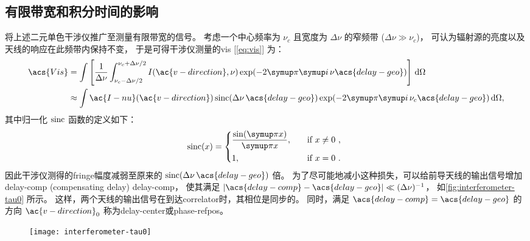 \subsection{有限带宽和积分时间的影响}

将上述二元单色干涉仪推广至测量有限带宽的信号。
考虑一个中心频率为 $\nu_c$ 且宽度为 $\Delta\nu$ 的窄频带 ($\Delta\nu \gg \nu_c$)，
可认为辐射源的亮度以及天线的响应在此频带内保持不变，
于是可得干涉仪测量的\ac{vis} [\autoref{eq:vis}] 为：
\begin{align}
  \acs{Vis}
    & = \int \left[ \frac{1}{\Delta\nu}
        \int_{\nu_c-\Delta\nu/2}^{\nu_c+\Delta\nu/2}
        I(\ac{v-direction}, \nu) \exp (-2\Cpi\Ci\, \nu\acs{delay-geo})
      \right] \,\D{\Omega} \\
    & \approx \int \ac{I-nu}(\ac{v-direction})
      \sinc (\Delta\nu\,\acs{delay-geo})
      \exp (-2\Cpi\Ci\, \nu_c\acs{delay-geo}) \,\D{\Omega},
  \label{eq:vis-bw}
\end{align}
其中归一化 $\operatorname{sinc}$ 函数的定义如下：
\begin{equation}
  \label{eq:sinc}
  \sinc(x) =
    \begin{dcases*}
      \frac{\sin(\Cpi x)}{\Cpi x}, \quad & if $x \neq 0$ , \\
      1, \quad & if $x = 0$ .
    \end{dcases*}
\end{equation}
因此干涉仪测得的\ac{fringe}幅度减弱至原来的
$\sinc(\Delta\nu\,\acs{delay-geo})$ 倍。
为了尽可能地减小这种损失，可以给前导天线的输出信号增加\acl{delay-comp}
(compensating delay) \ac{delay-comp}，
使其满足 $|\acs{delay-comp} - \acs{delay-geo}| \ll (\Delta\nu)^{-1}$，
如\autoref{fig:interferometer-tau0} 所示。
这样，两个天线的输出信号在到达\ac{correlator}时，其相位是同步的。
同时，满足 $\acs{delay-comp} = \acs{delay-geo}$ 的方向 $\ac{v-direction}_0$
称为\acf{delay-center}或\acf{phase-refpos}。

\begin{figure}[htp]
  \centering
  \texttt{[image: interferometer-tau0]}
  \label{fig:interferometer-tau0}
\end{figure}

